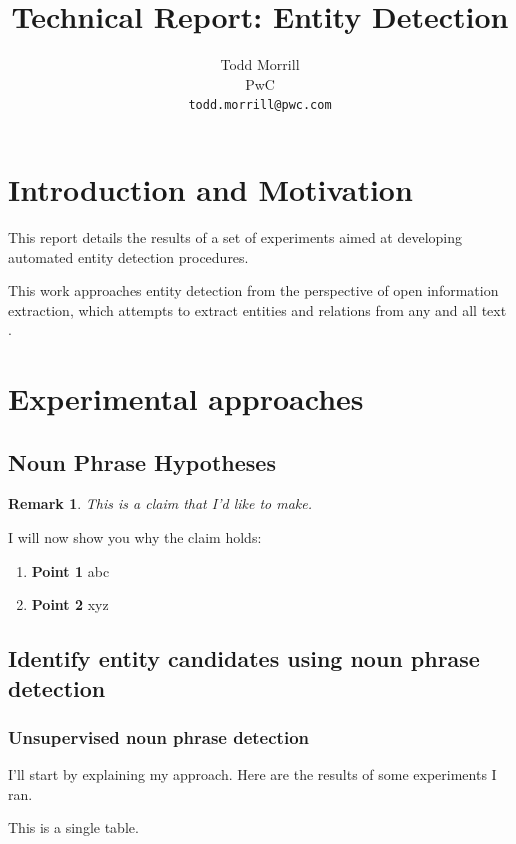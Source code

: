 \documentclass[11pt]{article} %
\title{Technical Report: Entity Detection} %
\date{}
\author{Todd Morrill\\
PwC\\
\texttt{todd.morrill@pwc.com}
}
\newtheorem*{remark}{Remark} %
\begin{document}
\maketitle %

\section{Introduction and Motivation} 
This report details the results of a set of experiments aimed at developing automated entity detection procedures.

This work approaches entity detection from the perspective of open information extraction, which attempts to extract entities and relations from any and all text \cite{TextRunner}.

\section{Experimental approaches}
\subsection{Noun Phrase Hypotheses}
\begin{remark}
    This is a claim that I'd like to make.
\end{remark}
I will now show you why the claim holds:
\begin{enumerate}
    \item \textbf{Point 1} abc
    \item \textbf{Point 2} xyz
\end{enumerate}

\subsection{Identify entity candidates using noun phrase detection}

\subsubsection{Unsupervised noun phrase detection} \label{unsupervised_noun_phrase}
I'll start by explaining my approach. Here are the results of some experiments I ran.

\begin{table}[h]
    \centering
    
    \caption{This is a single table.}
    \label{tab:grammar}
\end{table}
\end{document}
